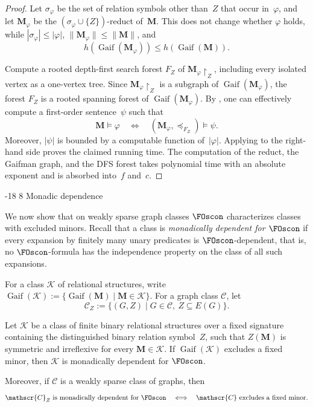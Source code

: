 \documentclass[1p,number,11pt]{elsarticle}
\makeatletter
\renewcommand\subsection{\@startsection{subsection}{2}{\z@}%
  {-18\p@ \@plus -4\p@ \@minus -4\p@}%
  {8\p@ \@plus 4\p@ \@minus 4\p@}%
  {\normalfont\normalsize\bfseries}}
\newcommand{\Gaif}{\operatorname{Gaif}}
\theoremstyle{plain}
\newcommand{\Cc}{\mathscr{C}}
\renewcommand{\leq}{\leqslant}
\makeatother
\begin{document}
\begin{proof}
Let $\sigma_\varphi$ be the set of relation symbols other than~$Z$ that occur
in~$\varphi$, and let $\mathbf M_\varphi$ be the
$(\sigma_\varphi\cup\{Z\})$-reduct of~$\mathbf M$. This does not change
whether $\varphi$ holds, while
$|\sigma_\varphi|\leq|\varphi|$,
$\|\mathbf M_\varphi\|\leq\|\mathbf M\|$, and
\[
 h(\Gaif(\mathbf M_\varphi))
 \leq h(\Gaif(\mathbf M)).
\]

Compute a rooted depth-first search forest $F_Z$ of
$\mathbf M_\varphi\!\upharpoonright_Z$, including every isolated vertex as a
one-vertex tree. Since $\mathbf M_\varphi\!\upharpoonright_Z$ is a subgraph of
$\Gaif(\mathbf M_\varphi)$, the forest $F_Z$ is a rooted spanning forest of
$\Gaif(\mathbf M_\varphi)$. By , one can effectively
compute a first-order sentence~$\psi$ such that
\[
   \mathbf M\models\varphi
   \quad\Longleftrightarrow\quad
   (\mathbf M_\varphi,\preceq_{F_Z})\models\psi.
\]
Moreover, $|\psi|$ is bounded by a computable function of~$|\varphi|$.
Applying  to the right-hand side proves the claimed
running time. The computation of the reduct, the Gaifman graph, and the DFS
forest takes polynomial time with an absolute exponent and is absorbed
into~$f$ and~$c$.
\end{proof}

\subsection{Monadic dependence}\label{subsec:dependence}

We now show that on weakly sparse graph classes $\FOscon$ characterizes classes with excluded minors. Recall that a class is \emph{monadically dependent for $\FOscon$} if every expansion by finitely many unary predicates is $\FOscon$-dependent, that is, no $\FOscon$-formula
has the independence property on the class of all such expansions.

For a class $\mathscr K$ of relational structures, write
$\Gaif(\mathscr K):=\{\Gaif(\mathbf M)\mid \mathbf M\in\mathscr K\}$.  For a graph class
$\Cc$, let
\[
   \Cc_Z
   :=
   \{(G,Z)\mid G\in\Cc,\ Z\subseteq E(G)\}.
\]

\begin{theorem}[store=thm:dependence,
    restate-keys={note=see \zcpageref[nocap]{thm:dependence}}]
Let $\mathscr K$ be a class of finite binary relational structures over a fixed
signature containing the distinguished binary relation symbol~$Z$, such that
$Z(\mathbf M)$ is symmetric and irreflexive for every
$\mathbf M\in\mathscr K$. If
$\Gaif(\mathscr K)$ excludes a fixed minor, then $\mathscr K$ is monadically
dependent for $\FOscon$.

Moreover, if $\Cc$ is a weakly sparse class of graphs, then
\[
   \Cc_Z\text{ is monadically dependent for }\FOscon
   \quad\Longleftrightarrow\quad
   \Cc\text{ excludes a fixed minor}.
\]
\end{theorem}
\end{document}
